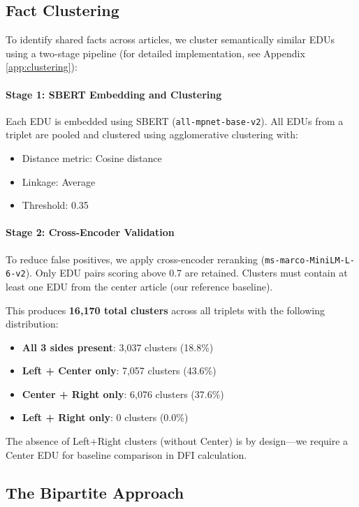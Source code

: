 \documentclass[11pt]{article}
\begin{document}
\subsection{Fact Clustering}
\label{sec:clustering-meth}

To identify shared facts across articles, we cluster semantically similar EDUs using a two-stage pipeline (for detailed implementation, see Appendix \ref{app:clustering}):

\paragraph{Stage 1: SBERT Embedding and Clustering}
Each EDU is embedded using SBERT (\texttt{all-mpnet-base-v2}). All EDUs from a triplet are pooled and clustered using agglomerative clustering with:
\begin{itemize}
    \item Distance metric: Cosine distance
    \item Linkage: Average
    \item Threshold: 0.35
\end{itemize}

\paragraph{Stage 2: Cross-Encoder Validation}
To reduce false positives, we apply cross-encoder reranking (\texttt{ms-marco-MiniLM-L-6-v2}). Only EDU pairs scoring above 0.7 are retained. Clusters must contain at least one EDU from the center article (our reference baseline).

This produces \textbf{16,170 total clusters} across all triplets with the following distribution:
\begin{itemize}
    \item \textbf{All 3 sides present}: 3,037 clusters (18.8\%)
    \item \textbf{Left + Center only}: 7,057 clusters (43.6\%)
    \item \textbf{Center + Right only}: 6,076 clusters (37.6\%)
    \item \textbf{Left + Right only}: 0 clusters (0.0\%)
\end{itemize}

The absence of Left+Right clusters (without Center) is by design---we require a Center EDU for baseline comparison in DFI calculation.

\subsection{The Bipartite Approach}
\label{sec:bipartite}
\end{document}
